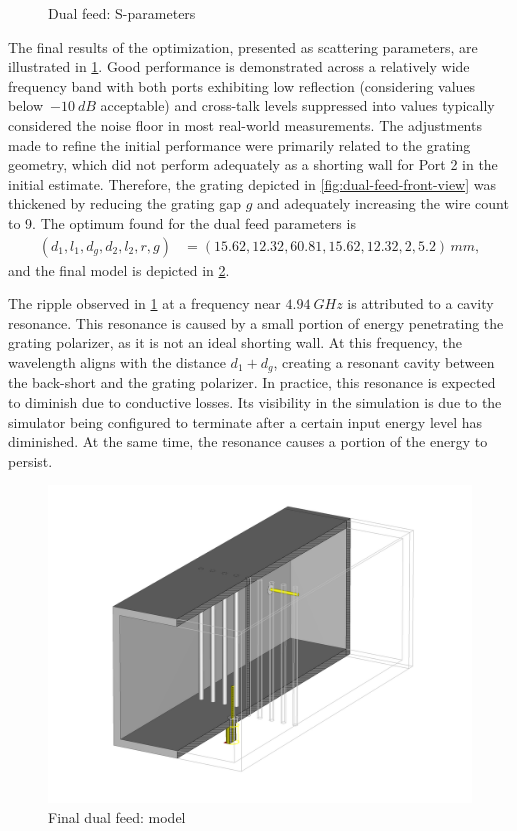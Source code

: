 \documentclass[11pt,a4paper,twoside,openany]{report}
\begin{document}
\begin{figure}[!ht]
    \centering
    
    \caption{\label{fig:dual-feed-sparameters}Dual feed: S-parameters}
\end{figure}

The final results of the optimization, presented as scattering parameters, are illustrated in \cref{fig:dual-feed-sparameters}. Good performance is demonstrated across a relatively wide frequency band with both ports exhibiting low reflection (considering values below~$-\qty{10}{dB}$ acceptable) and cross-talk levels suppressed into values typically considered the noise floor in most real-world measurements. The adjustments made to refine the initial performance were primarily related to the grating geometry, which did not perform adequately as a shorting wall for Port 2 in the initial estimate. Therefore, the grating depicted in \cref{fig:dual-feed-front-view} was thickened by reducing the grating gap $g$ and adequately increasing the wire count to 9. The optimum found for the dual feed parameters is
\begin{align}
    \label{eq:dual-feed-optimum}
    (d_1,l_1,d_g,d_2,l_2,r,g) &= (15.62,12.32,60.81,15.62,12.32,2,5.2)\,\unit{mm},
\end{align}
and the final model is depicted in \cref{fig:dual-feed-perspective}.

\begin{remark}
    The ripple observed in \cref{fig:dual-feed-sparameters} at a frequency near $\qty{4.94}{GHz}$ is attributed to a cavity resonance. This resonance is caused by a small portion of energy penetrating the grating polarizer, as it is not an ideal shorting wall. At this frequency, the wavelength aligns with the distance $d_1+d_g$, creating a resonant cavity between the back-short and the grating polarizer. In practice, this resonance is expected to diminish due to conductive losses. Its visibility in the simulation is due to the simulator being configured to terminate after a certain input energy level has diminished. At the same time, the resonance causes a portion of the energy to persist.
\end{remark}

\begin{figure}[!ht]
    \centering
    \includegraphics[width=.8\textwidth]{src/dual_feed_perspective.png}
    \caption{\label{fig:dual-feed-perspective}Final dual feed: model}
\end{figure}
\end{document}
